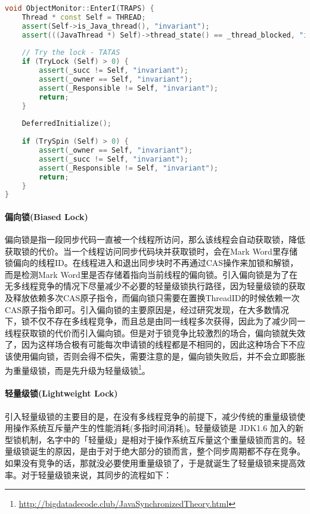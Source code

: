 \documentclass[../../../interview-questions.tex]{subfiles}
\begin{document}
\begin{lstlisting}[language=C++]
void ObjectMonitor::EnterI(TRAPS) {
    Thread * const Self = THREAD;
    assert(Self->is_Java_thread(), "invariant");
    assert(((JavaThread *) Self)->thread_state() == _thread_blocked, "invariant");
    
    // Try the lock - TATAS
    if (TryLock (Self) > 0) {
        assert(_succ != Self, "invariant");
        assert(_owner == Self, "invariant");
        assert(_Responsible != Self, "invariant");
        return;
    }
    
    DeferredInitialize();
    
    if (TrySpin (Self) > 0) {
        assert(_owner == Self, "invariant");
        assert(_succ != Self, "invariant");
        assert(_Responsible != Self, "invariant");
        return;
    }
}      
\end{lstlisting}


\paragraph{偏向锁(Biased Lock)}偏向锁是指一段同步代码一直被一个线程所访问，那么该线程会自动获取锁，降低获取锁的代价。当一个线程访问同步代码块并获取锁时，会在Mark Word里存储锁偏向的线程ID。在线程进入和退出同步块时不再通过CAS操作来加锁和解锁，而是检测Mark Word里是否存储着指向当前线程的偏向锁。引入偏向锁是为了在无多线程竞争的情况下尽量减少不必要的轻量级锁执行路径，因为轻量级锁的获取及释放依赖多次CAS原子指令，而偏向锁只需要在置换ThreadID的时候依赖一次CAS原子指令即可。引入偏向锁的主要原因是，经过研究发现，在大多数情况下，锁不仅不存在多线程竞争，而且总是由同一线程多次获得，因此为了减少同一线程获取锁的代价而引入偏向锁。但是对于锁竞争比较激烈的场合，偏向锁就失效了，因为这样场合极有可能每次申请锁的线程都是不相同的，因此这种场合下不应该使用偏向锁，否则会得不偿失，需要注意的是，偏向锁失败后，并不会立即膨胀为重量级锁，而是先升级为轻量级锁\footnote{\url{http://bigdatadecode.club/JavaSynchronizedTheory.html}}。

\paragraph{轻量级锁(Lightweight Lock)}
引入轻量级锁的主要目的是，在没有多线程竞争的前提下，减少传统的重量级锁使用操作系统互斥量产生的性能消耗(多指时间消耗)。轻量级锁是 JDK1.6 加入的新型锁机制，名字中的「轻量级」是相对于操作系统互斥量这个重量级锁而言的。轻量级锁诞生的原因，是由于对于绝大部分的锁而言，整个同步周期都不存在竞争。如果没有竞争的话，那就没必要使用重量级锁了，于是就诞生了轻量级锁来提高效率。对于轻量级锁来说，其同步的流程如下：
\end{document}
